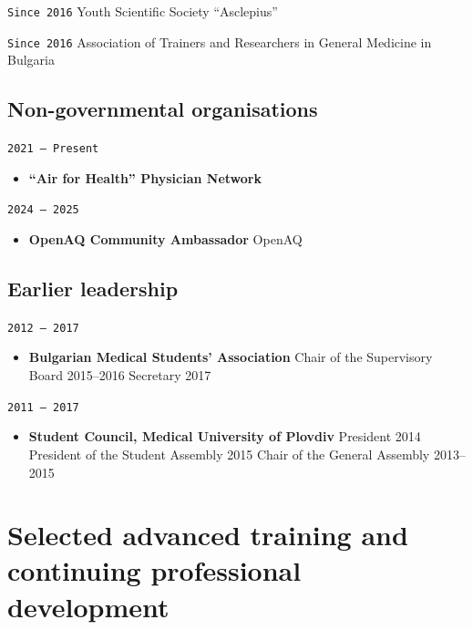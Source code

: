 \documentclass[
  10.5pt,
  a4paper,
  DIV=11,
  numbers=noendperiod]{scrartcl}
\providecommand{\tightlist}{%
  \setlength{\itemsep}{0pt}\setlength{\parskip}{0pt}}
\let\oldtexttt\texttt
\renewcommand{\texttt}[1]{{\color{cvbronze}\small\oldtexttt{#1}}}
\begin{document}
\texttt{Since\ 2016} Youth Scientific Society ``Asclepius''

\texttt{Since\ 2016} Association of Trainers and Researchers in General
Medicine in Bulgaria

\subsection{Non-governmental
organisations}\label{non-governmental-organisations}

\texttt{2021\ –\ Present}

\begin{itemize}
\tightlist
\item
  \textbf{``Air for Health'' Physician Network}
\end{itemize}

\texttt{2024\ –\ 2025}

\begin{itemize}
\tightlist
\item
  \textbf{OpenAQ Community Ambassador} \textbar{} OpenAQ
\end{itemize}

\subsection{Earlier leadership}\label{earlier-leadership}

\texttt{2012\ –\ 2017}

\begin{itemize}
\tightlist
\item
  \textbf{Bulgarian Medical Students' Association} \textbar{} Chair of
  the Supervisory Board 2015--2016 \textbar{} Secretary 2017
\end{itemize}

\texttt{2011\ –\ 2017}

\begin{itemize}
\tightlist
\item
  \textbf{Student Council, Medical University of Plovdiv} \textbar{}
  President 2014 \textbar{} President of the Student Assembly 2015
  \textbar{} Chair of the General Assembly 2013--2015
\end{itemize}

\section{Selected advanced training and continuing professional
development}\label{selected-advanced-training-and-continuing-professional-development}
\end{document}
